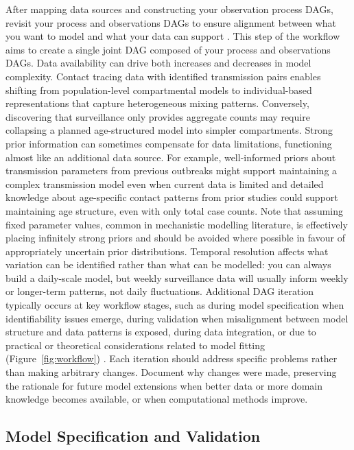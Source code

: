 \documentclass{article}
\begin{document}
After mapping data sources and constructing your observation process DAGs, revisit your process and observations DAGs to ensure alignment between what you want to model and what your data can support \citep{gelman2020bayesian}.
This step of the workflow aims to create a single joint DAG composed of your process and observations DAGs.
Data availability can drive both increases and decreases in model complexity.
Contact tracing data with identified transmission pairs enables shifting from population-level compartmental models to individual-based representations that capture heterogeneous mixing patterns.
Conversely, discovering that surveillance only provides aggregate counts may require collapsing a planned age-structured model into simpler compartments.
Strong prior information can sometimes compensate for data limitations, functioning almost like an additional data source.
For example, well-informed priors about transmission parameters from previous outbreaks might support maintaining a complex transmission model even when current data is limited and detailed knowledge about age-specific contact patterns from prior studies could support maintaining age structure, even with only total case counts.
Note that assuming fixed parameter values, common in mechanistic modelling literature, is effectively placing infinitely strong priors and should be avoided where possible in favour of appropriately uncertain prior distributions.
Temporal resolution affects what variation can be identified rather than what can be modelled: you can always build a daily-scale model, but weekly surveillance data will usually inform weekly or longer-term patterns, not daily fluctuations.
Additional DAG iteration typically occurs at key workflow stages, such as during model specification when identifiability issues emerge, during validation when misalignment between model structure and data patterns is exposed, during data integration, or due to practical or theoretical considerations related to model fitting (Figure~\ref{fig:workflow}) \citep{corbella2022inferring}.
Each iteration should address specific problems rather than making arbitrary changes.
Document why changes were made, preserving the rationale for future model extensions when better data or   more domain knowledge becomes available, or when computational methods improve.

\subsection{Model Specification and Validation}\label{sec:spec-validate}
\end{document}
